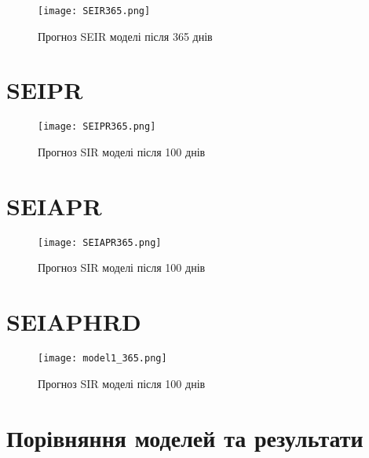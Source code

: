 \begin{figure}[H]
    \centering
    \texttt{[image: SEIR365.png]}
    \caption{Прогноз SEIR моделі після 365 днів}
    \label{fig:plot2}
\end{figure}
\section{SEIPR}

\begin{figure}[H]
    \centering
    \texttt{[image: SEIPR365.png]}
    \caption{Прогноз SIR моделі після 100 днів}
    \label{fig:plot3}
\end{figure}
\section{SEIAPR}
\begin{figure}[H]
    \centering
    \texttt{[image: SEIAPR365.png]}
    \caption{Прогноз SIR моделі після 100 днів}
    \label{fig:plot4}
\end{figure}
\section{SEIAPHRD}
\begin{figure}[H]
    \centering
    \texttt{[image: model1\_365.png]}
    \caption{Прогноз SIR моделі після 100 днів}
    \label{fig:plot5}
\end{figure}
\section{Порівняння моделей та результати}